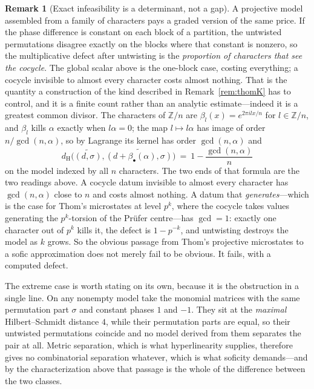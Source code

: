 \documentclass[11pt]{amsart}
\theoremstyle{definition}
\newtheorem{remark}[theorem]{Remark}
\theoremstyle{plain}
\newcommand{\Z}{\mathbb Z}
\newcommand{\distH}{d_{\mathrm H}}
\begin{document}
\begin{remark}[Exact infeasibility is a determinant, not a gap]
A projective model assembled from a family of characters pays a graded version of the same price.  If the phase difference is constant on each block of a partition, the untwisted permutations disagree exactly on the blocks where that constant is nonzero, so the multiplicative defect after untwisting is the \emph{proportion of characters that see the cocycle}.  The global scalar above is the one-block case, costing everything; a cocycle invisible to almost every character costs almost nothing.  That is the quantity a construction of the kind described in Remark~\ref{rem:thomK} has to control, and it is a finite count rather than an analytic estimate---indeed it is a greatest common divisor.  The characters of \(\Z/n\) are \(\beta_l(x)=e^{2\pi ilx/n}\) for \(l\in\Z/n\), and \(\beta_l\) kills \(\alpha\) exactly when \(l\alpha=0\); the map \(l\mapsto l\alpha\) has image of order \(n/\gcd(n,\alpha)\), so by Lagrange its kernel has order \(\gcd(n,\alpha)\) and
\[
 \distH\bigl(\widetilde{(d,\sigma)},\widetilde{(d+\beta_\bullet(\alpha),\sigma)}\bigr)
 \ =\ 1-\frac{\gcd(n,\alpha)}{n}
\]
on the model indexed by all \(n\) characters.  The two ends of that formula are the two readings above.  A cocycle datum invisible to almost every character has \(\gcd(n,\alpha)\) close to \(n\) and costs almost nothing.  A datum that \emph{generates}---which is the case for Thom's microstates at level \(p^k\), where the cocycle takes values generating the \(p^k\)-torsion of the Pr\"ufer centre---has \(\gcd=1\): exactly one character out of \(p^k\) kills it, the defect is \(1-p^{-k}\), and untwisting destroys the model as \(k\) grows.  So the obvious passage from Thom's projective microstates to a sofic approximation does not merely fail to be obvious.  It fails, with a computed defect.

The extreme case is worth stating on its own, because it is the obstruction in a single line.  On any nonempty model take the monomial matrices with the same permutation part \(\sigma\) and constant phases \(1\) and \(-1\).  They sit at the \emph{maximal} Hilbert--Schmidt distance \(4\), while their permutation parts are equal, so their untwisted permutations coincide and no model derived from them separates the pair at all.  Metric separation, which is what hyperlinearity supplies, therefore gives no combinatorial separation whatever, which is what soficity demands---and by the characterization above that passage is the whole of the difference between the two classes.
\end{remark}
\end{document}
